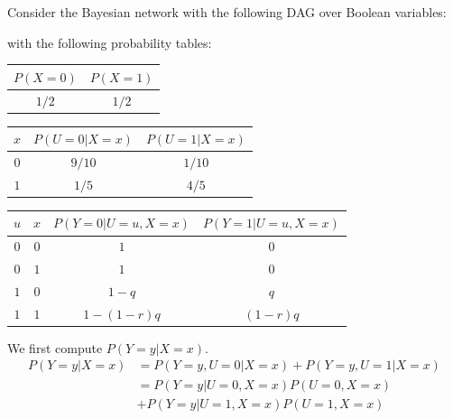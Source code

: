 \documentclass{article}
\begin{document}
\clearpage
\problem{}
Consider the Bayesian network with the following DAG over Boolean variables:
\begin{center}
\end{center}
with the following probability tables:
\begin{center}
\begin{tabular}{|c|c|}
    \hline
    $P(X = 0)$ & $P(X = 1)$ \\
    \hline
    $1/2$ & $1/2$ \\
    \hline
\end{tabular}
\end{center}
\begin{center}
\begin{tabular}{|c|c|c|}
    \hline
    $x$ & $P(U = 0 | X = x)$ & $P(U = 1 | X = x)$ \\
    \hline
    $0$ & $9/10$ & $1/10$ \\
    \hline
    $1$ & $1/5$ & $4/5$ \\
    \hline
\end{tabular}
\end{center}
\begin{center}
\begin{tabular}{|c|c|c|c|}
    \hline
    $u$ & $x$ & $P(Y = 0 | U = u, X = x)$ & $P(Y = 1 | U = u, X = x)$ \\
    \hline
    $0$ & $0$ & $1$ & $0$ \\
    \hline
    $0$ & $1$ & $1$ & $0$ \\
    \hline
    $1$ & $0$ & $1 - q$ & $q$ \\
    \hline
    $1$ & $1$ & $1 - (1 - r)q$ & $(1 - r)q$ \\
    \hline
\end{tabular}
\end{center}
We first compute $P(Y = y|X = x)$.
\begin{align*}
    P(Y = y|X = x) & = P(Y = y, U = 0|X = x) + P(Y = y, U = 1|X = x) \\
    & = P(Y = y|U = 0, X = x)P(U = 0, X = x) \\
    & + P(Y = y|U = 1, X = x)P(U = 1, X = x)
\end{align*}
\end{document}
